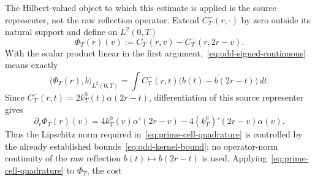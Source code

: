 The Hilbert-valued object to which this estimate is applied is the source
representer, not the raw reflection operator.  Extend $C_T^-(r,\cdot)$ by zero
outside its natural support and define on $L^2(0,T)$
\[
 \boxed{\Phi_T(r)(v):=C_T^-(r,v)-C_T^-(r,2r-v).}
\tag{6.21a}\label{eq:odd-source-representer}
\]
With the scalar product linear in the first argument,~\eqref{eq:odd-signed-continuous}
means exactly
\[
 \langle\Phi_T(r),b\rangle_{L^2(0,T)}
 =\int C_T^-(r,t)
 \overline{\bigl(b(t)-b(2r-t)\bigr)}\,dt.
\tag{6.21b}\label{eq:odd-source-representer-pairing}
\]
Since $C_T^-(r,t)=2k_T^0(t)\alpha(2r-t)$, differentiation of this source
representer gives
\[
 \boxed{
 \partial_r\Phi_T(r)(v)
 =4k_T^0(v)\alpha'(2r-v)
 -4(k_T^0)'(2r-v)\alpha(v).
 }
\tag{6.21c}\label{eq:odd-source-representer-derivative}
\]
Thus the Lipschitz norm required in~\eqref{eq:prime-cell-quadrature} is controlled
by the already established bounds~\eqref{eq:odd-kernel-bound}; no operator-norm
continuity of the raw reflection $b(t)\mapsto b(2r-t)$ is used.
Applying~\eqref{eq:prime-cell-quadrature} to $\Phi_T$, the cost
